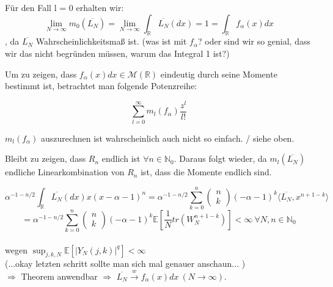 \documentclass[a4paper, 11pt]{scrreprt}
\newcommand{\RR}{\mathbb{R}}
\newcommand{\EE}{\mathbb{E}}
\newcommand{\NN}{\mathbb{N}}
\begin{document}
Für den Fall l = 0 erhalten wir:
\[\lim_{N \to \infty} m_0(\overline{L_{N}}) 
= \lim_{N \to \infty} \int_\RR \overline{L_{N}}(dx) = 1 
= \int_\RR f_\alpha(x)dx\]
, da $ \overline{L_N} $ Wahrscheinlichkeitsmaß ist. (was ist mit $ f_{\alpha} $? oder sind wir so genial, dass wir das nicht begründen müssen, warum das Integral 1 ist?)

Um zu zeigen, dass $f_\alpha(x)dx \in \mathcal{M}(\RR)$ eindeutig durch seine Momente bestimmt ist, betrachtet man folgende Potenzreihe:

\[\sum_{l=0}^\infty m_l(f_\alpha) \frac{z^l}{l!}\]

$m_l(f_\alpha)$ auszurechnen ist wahrscheinlich auch nicht so einfach. / siehe oben. 

Bleibt zu zeigen, dass $ R_n $ endlich ist $ \forall n \in \NN_0 $. Daraus folgt wieder, da $ m_l(\overline{L_N}) $ endliche Linearkombination von $R_n$ ist, dass die Momente endlich sind.

 \[ \alpha^{-1-n/2} \int_{\RR}\overline{L_{N}}(dx)x(x-\alpha-1)^{n} = \alpha^{-1-n/2}\sum_{k=0}^n \begin{pmatrix} n\\k\end{pmatrix} (-\alpha -1)^k \langle \overline{L_N}, x^{n+1-k} \rangle \] 
\[= \alpha^{-1-n/2}\sum_{k=0}^n \begin{pmatrix} n\\k\end{pmatrix} (-\alpha -1)^k \EE [\dfrac{1}{N} tr(W_N^{n+1-k})]
< \infty ~\forall N,n \in \NN_0 \]\\
wegen $ \sup_{j,k,N} \EE[\vert Y_N(j,k)\vert ^{q}]< \infty$ \\
(...okay letzten schritt sollte man sich mal genauer anschaun... )\\
$ \Rightarrow $ Theorem anwendbar $ \Rightarrow $  $ \overline{L_N} \overset{w}{\rightarrow} f_\alpha (x)dx~(N \rightarrow \infty) $. \\
\end{document}
